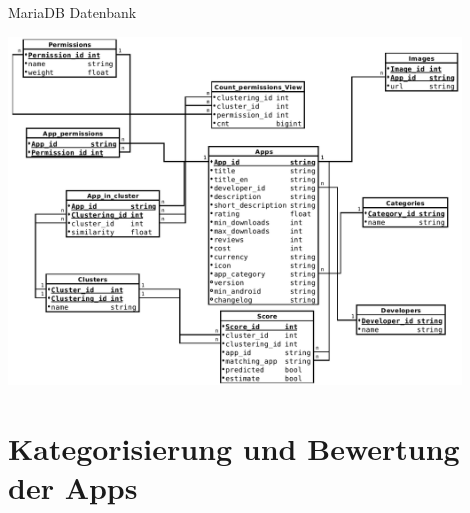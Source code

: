 \documentclass[compress,t]{beamer}
\begin{document}
\begin{frame}{MariaDB Datenbank}

    \begin{center}
        \includegraphics[width=0.9\textwidth]{img/Scheme_extended_3.png}
    \end{center}

\end{frame}

\section{Kategorisierung und Bewertung der Apps}
\end{document}
